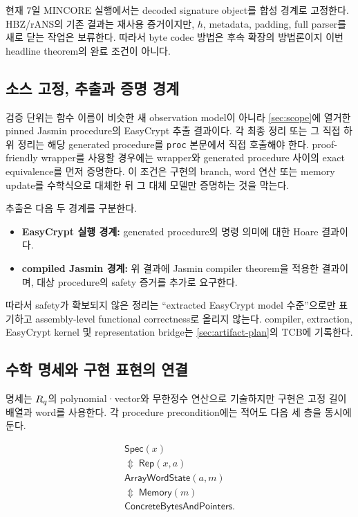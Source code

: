 현재 7일 MINCORE 실행에서는 decoded signature object를 합성 경계로 고정한다.
HBZ/rANS의 기존 결과는 재사용 증거이지만, \(h\), metadata, padding, full parser를
새로 닫는 작업은 보류한다. 따라서 byte codec 방법은 후속 확장의 방법론이지
이번 headline theorem의 완료 조건이 아니다.

\subsection{소스 고정, 추출과 증명 경계}

검증 단위는 함수 이름이 비슷한 새 observation model이 아니라
\cref{sec:scope}에 열거한 pinned Jasmin procedure의 EasyCrypt 추출 결과이다.
각 최종 정리 또는 그 직접 하위 정리는 해당 generated procedure를
\texttt{proc} 본문에서 직접 호출해야 한다. proof-friendly wrapper를 사용할
경우에는 wrapper와 generated procedure 사이의 exact equivalence를 먼저
증명한다. 이 조건은 구현의 branch, word 연산 또는 memory update를 수학식으로
대체한 뒤 그 대체 모델만 증명하는 것을 막는다.

추출은 다음 두 경계를 구분한다.

\begin{itemize}
  \item \textbf{EasyCrypt 실행 경계:} generated procedure의 명령 의미에 대한
        Hoare 결과이다.
  \item \textbf{compiled Jasmin 경계:} 위 결과에 Jasmin compiler theorem을
        적용한 결과이며, 대상 procedure의 safety 증거를 추가로 요구한다.
\end{itemize}

따라서 safety가 확보되지 않은 정리는 ``extracted EasyCrypt model 수준''으로만
표기하고 assembly-level functional correctness로 올리지 않는다. compiler,
extraction, EasyCrypt kernel 및 representation bridge는
\cref{sec:artifact-plan}의 TCB에 기록한다.

\subsection{수학 명세와 구현 표현의 연결}

명세는 \(R_q\)의 polynomial·vector와 무한정수 연산으로 기술하지만 구현은
고정 길이 배열과 word를 사용한다. 각 procedure precondition에는 적어도 다음
세 층을 동시에 둔다.

\[
\begin{gathered}
  \mathsf{Spec}(x)\\[-0.2em]
  \Updownarrow\;\mathsf{Rep}(x,a)\\[-0.2em]
  \mathsf{ArrayWordState}(a,m)\\[-0.2em]
  \Updownarrow\;\mathsf{Memory}(m)\\[-0.2em]
  \mathsf{ConcreteBytesAndPointers}.
\end{gathered}
\]

